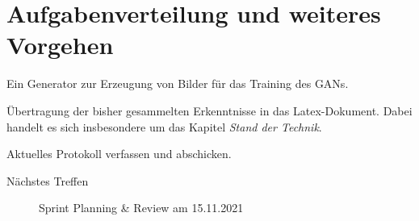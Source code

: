 \section{Aufgabenverteilung und weiteres Vorgehen}
\begin{description}[style=nextline]
	\item[Implementierung Testdatengenerator \todoperson{Jonas, Patrick}] 
	Ein Generator zur Erzeugung von Bilder für das Training des GANs.
	
	\item[Dokumentation \todoperson{Jonas, Patrick}]
	Übertragung der bisher gesammelten Erkenntnisse in das Latex-Dokument.
	Dabei handelt es sich insbesondere um das Kapitel \textit{Stand der Technik}.
	
	\item[Protokoll \todoperson{Jonas}]
	Aktuelles Protokoll verfassen und abschicken.
\end{description}
\begin{description}
	\item[Nächstes Treffen] Sprint Planning \& Review am 15.11.2021
\end{description}

